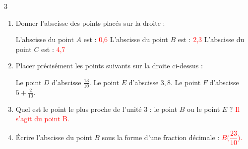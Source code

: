 \documentclass[a4paper]{book}
\begin{document}
{\begin{exerciceNote}{3}
\begin{center}
        \end{center}
        
        \medskip
        
        \begin{enumerate}[leftmargin=*]
            \item Donner l'abscisse des points placés sur la droite :
            
            L'abscisse du point $A$ est : \textcolor{red}{0,6} \quad \quad
            L'abscisse du point $B$ est : \textcolor{red}{2,3} \quad \quad
            L'abscisse du point $C$ est : \textcolor{red}{4,7}

            \medskip
    
            \item Placer précisément les points suivants sur la droite ci-dessus :
    
            Le point $D$ d'abscisse $\frac{13}{10}$. \quad \quad 
            Le point $E$ d'abscisse $3,8$. \quad \quad
            Le point $F$ d'abscisse $5 + \frac{2}{10}$.

            \medskip
    
            \item Quel est le point le plus proche de l'unité 3 : le point $B$ ou le point $E$ ? \textcolor{red}{Il s'agit du point B.}

            \medskip
            
            \item Écrire l'abscisse du point $B$ sous la forme d'une fraction décimale : \textcolor{red}{$B\bigg(\dfrac{23}{10}\bigg)$.}
        \end{enumerate}   
    \end{exerciceNote}


}
\end{document}
